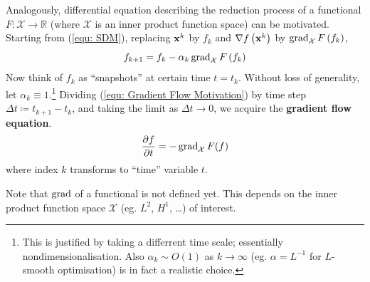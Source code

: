 \documentclass[../dissertation.tex]{subfiles}
\begin{document}
Analogously, differential equation describing the reduction process of a functional $F:\mathcal{X} \rightarrow \mathbb{R}$ (where $\mathcal{X}$ is an inner product function space) can be motivated.
Starting from (\ref{equ: SDM}), replacing $\mathbf{x}^{k}$ by $f_k$ and $\nabla f\left( \mathbf{x}^k \right)$ by $\operatorname{grad}_{\mathcal{X}} F\left( f_k \right)$,
\begin{equation}
    f_{k+1} = f_k - \alpha_k \operatorname{grad}_{\mathcal{X}} F \left( f_k \right)
    \label{equ: Gradient Flow Motivation}
\end{equation}
Now think of $f_k$ as ``snapshots'' at certain time $t = t_k$.
Without loss of generality, let $\alpha_k \equiv 1$.\footnote{
This is justified by taking a differrent time scale; essentially nondimensionalisation.
Also $\alpha_k \sim O (1)$ as $k \rightarrow \infty$ (eg. $\alpha = L^{-1}$ for $L$-smooth optimisation) is in fact a realistic choice.}
Dividing (\ref{equ: Gradient Flow Motivation}) by time step $\Delta t \coloneqq t_{k+1} - t_k$,
and taking the limit as $\Delta t \rightarrow 0$,
we acquire the \textbf{gradient flow equation}\cite{YSC2021}.
\begin{equation}
    \frac{\partial f}{\partial t} = - \operatorname{grad}_{\mathcal{X}} F (f)
    \label{equ: Gradient Flow Equation}
\end{equation}
where index $k$ transforms to ``time'' variable $t$.

Note that $\operatorname{grad}$ of a functional is not defined yet. This depends on the inner product function space $\mathcal{X}$ (eg. $L^2$, $H^1$, \ldots) of interest.
\end{document}
